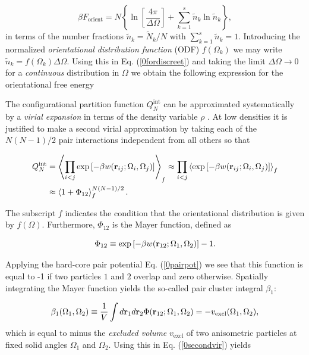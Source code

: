 \begin{equation}
\beta F_{\text{orient}}=N\left\{\ln \left[\frac{4\pi}{\Delta \Omega}\right] + \sum_{k=1}^{s}\tilde{n}_{k}\ln \tilde{n}_{k} \right\},
\label{0fordiscreet}
\end{equation}
in terms of the number fractions $\tilde{n}_{k}=\tilde{N}_{k}/N$ with $\sum_{k=1}^{s}\tilde{n}_{k}=1$. Introducing the normalized {\em orientational distribution function} (ODF) $f(\Omega_{k})$ we may write $\tilde{n}_{k}=f(\Omega_{k})\Delta\Omega$. Using this in Eq. (\ref{0fordiscreet}) and taking the  limit $\Delta \Omega \rightarrow 0$ for a {\em continuous} distribution in $\Omega$ we obtain the following expression for the orientational free energy

The configurational partition function  $Q_{N}^{\text{int}}$ can be approximated systematically by a {\em virial expansion} in terms of the density variable $\rho$ \cite{hansenmacdonald}. At low densities it is justified to make a second virial approximation   by taking each of the $N(N-1)/2$ pair interactions independent from all others so that

\begin{align}
Q_{N}^{\text{int}}&= \left \langle \prod _{i<j}
\exp\left[-\beta w({\bf r} _{ij}; \Omega_{i}, \Omega_{j})\right]  \right \rangle _{f}
\approx \prod _{i<j}
\left < \exp\left[-\beta w({\bf r} _{ij}; \Omega_{i}, \Omega_{j})\right]  \right>_{f} \nonumber \\
&\approx\left<1+\Phi_{12}\right>_{f} ^{N(N-1)/2}. \label{0secondvir}
\end{align}

The subscript $f$ indicates the condition that the orientational distribution is given by $f(\Omega)$. Furthermore, $\Phi_{12}$ is the Mayer function, defined as

\begin{equation}
\Phi_{12}\equiv \exp\left[-\beta w({\bf r} _{12}; \Omega_{1}, \Omega_{2})\right]-1.
\end{equation}

Applying the hard-core pair potential Eq. (\ref{0pairpot}) we see that this function is equal to -1  if two particles $1$ and $2$ overlap and zero otherwise. Spatially integrating the Mayer function yields the so-called pair cluster integral $\beta _{1}$:

\begin{equation}
\beta_{1}(\Omega_{1},\Omega_{2})\equiv \frac{1}{V} \int d{\bf r}_{1}d {\bf r}_{2} \Phi({\bf r} _{12}; \Omega_{1}, \Omega_{2})=-v_{\text{excl}}(\Omega_{1},\Omega_{2}),
\label{0cluster}
\end{equation}
which is equal to minus the {\em excluded volume} $v_{\text{excl}}$ of two anisometric particles at fixed solid angles $\Omega_{1}$ and $\Omega_{2}$. Using this in Eq. (\ref{0secondvir}) yields

